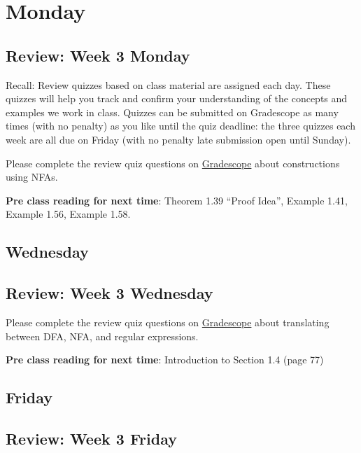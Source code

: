 \newpage

\section*{Monday}


    
\subsection*{Review: Week 3 Monday}


Recall: Review quizzes based on class material are assigned each day. 
These quizzes will help you track and confirm your understanding of the concepts and examples 
we work in class. Quizzes can be submitted on Gradescope as many times (with no penalty) as 
you like until the quiz deadline: the three quizzes each week are all due on Friday (with no penalty 
late submission open until Sunday).

Please complete the review quiz questions on \href{http://gradescope.com}{Gradescope} about 
constructions using NFAs.

{\bf Pre class reading for next time}: Theorem 1.39 ``Proof Idea'', Example 1.41, Example 1.56, Example 1.58.


\newpage
\subsection*{Wednesday}



\subsection*{Review: Week 3 Wednesday}

Please complete the review quiz questions on \href{http://gradescope.com}{Gradescope} about 
translating between DFA, NFA, and regular expressions.


{\bf Pre class reading for next time}: Introduction to Section 1.4 (page 77)



\newpage
\subsection*{Friday}



\subsection*{Review: Week 3 Friday}


